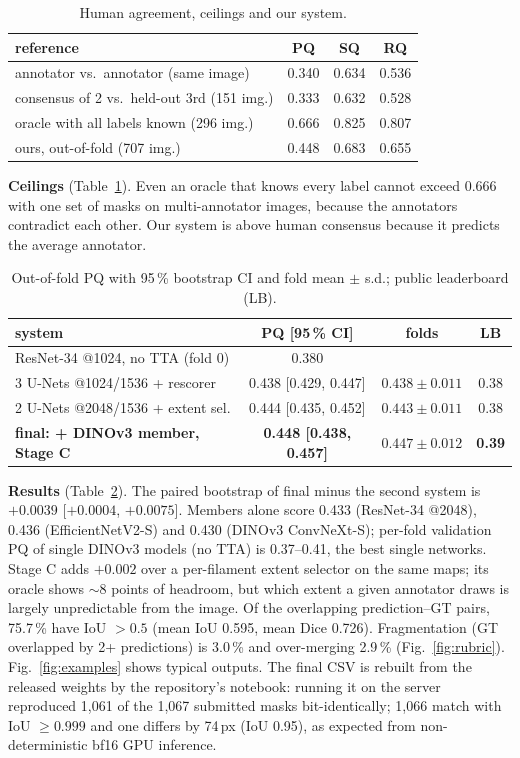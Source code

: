 \documentclass[sigconf]{acmart}
\begin{document}
\begin{table}[t]
\caption{Human agreement, ceilings and our system.}\label{tab:ceil}
\centering\footnotesize
\begin{tabular}{@{}lccc@{}}
\toprule
reference & PQ & SQ & RQ \\
\midrule
annotator vs.\ annotator (same image) & 0.340 & 0.634 & 0.536 \\
consensus of 2 vs.\ held-out 3rd (151 img.) & 0.333 & 0.632 & 0.528 \\
oracle with all labels known (296 img.) & 0.666 & 0.825 & 0.807 \\
ours, out-of-fold (707 img.) & 0.448 & 0.683 & 0.655 \\
\bottomrule
\end{tabular}
\end{table}

\textbf{Ceilings} (Table~\ref{tab:ceil}). Even an oracle that knows every label cannot exceed 0.666 with one set of masks on multi-annotator images, because the annotators contradict each other. Our system is above human consensus because it predicts the average annotator.

\begin{table}[t]
\caption{Out-of-fold PQ with 95\,\% bootstrap CI and fold mean $\pm$ s.d.; public leaderboard (LB).}\label{tab:results}
\centering\footnotesize
\setlength{\tabcolsep}{3pt}
\begin{tabular}{@{}lccc@{}}
\toprule
system & PQ [95\,\% CI] & folds & LB \\
\midrule
ResNet-34 @1024, no TTA (fold 0) & 0.380 & & \\
3 U-Nets @1024/1536 + rescorer & 0.438 [0.429, 0.447] & $0.438\pm0.011$ & 0.38 \\
2 U-Nets @2048/1536 + extent sel. & 0.444 [0.435, 0.452] & $0.443\pm0.011$ & 0.38 \\
\textbf{final: + DINOv3 member, Stage C} & \textbf{0.448 [0.438, 0.457]} & $0.447\pm0.012$ & \textbf{0.39} \\
\bottomrule
\end{tabular}
\end{table}

\textbf{Results} (Table~\ref{tab:results}). The paired bootstrap of final minus the second system is $+0.0039$ [$+0.0004$, $+0.0075$]. Members alone score 0.433 (ResNet-34 @2048), 0.436 (EfficientNetV2-S) and 0.430 (DINOv3 ConvNeXt-S); per-fold validation PQ of single DINOv3 models (no TTA) is 0.37--0.41, the best single networks. Stage C adds $+0.002$ over a per-filament extent selector on the same maps; its oracle shows ${\sim}8$ points of headroom, but which extent a given annotator draws is largely unpredictable from the image. Of the overlapping prediction--GT pairs, 75.7\,\% have IoU $>0.5$ (mean IoU 0.595, mean Dice 0.726). Fragmentation (GT overlapped by 2+ predictions) is 3.0\,\% and over-merging 2.9\,\% (Fig.~\ref{fig:rubric}). Fig.~\ref{fig:examples} shows typical outputs. The final CSV is rebuilt from the released weights by the repository's notebook: running it on the server reproduced 1{,}061 of the 1{,}067 submitted masks bit-identically; 1{,}066 match with IoU $\ge0.999$ and one differs by 74\,px (IoU 0.95), as expected from non-deterministic bf16 GPU inference.
\end{document}
